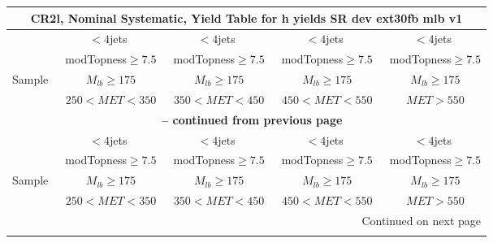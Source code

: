 \documentclass{article}
\begin{document}
\begin{longtable}{|l|c|c|c|c|} 
 
\multicolumn{5}{c}{ CR2l, Nominal Systematic, Yield Table for h yields SR dev ext30fb mlb v1 }\\* \hline 
  & $<4$jets  & $<4$jets  & $<4$jets  & $<4$jets \\* 
  & ~modTopness$\ge7.5$  & ~modTopness$\ge7.5$  & ~modTopness$\ge7.5$  & ~modTopness$\ge7.5$ \\* 
Sample  & ~$M_{lb}\ge175$  & ~$M_{lb}\ge175$  & ~$M_{lb}\ge175$  & ~$M_{lb}\ge175$ \\* 
  & ~$250<MET<350$  & ~$350<MET<450$  & ~$450<MET<550$  & ~$MET>550$ \\* 
\hline \hline 
\endfirsthead 
 
\multicolumn{5}{c}{{\bfseries \tablename\ \thetable{} -- continued from previous page}}\\* \hline 
  & $<4$jets  & $<4$jets  & $<4$jets  & $<4$jets \\* 
  & ~modTopness$\ge7.5$  & ~modTopness$\ge7.5$  & ~modTopness$\ge7.5$  & ~modTopness$\ge7.5$ \\* 
Sample  & ~$M_{lb}\ge175$  & ~$M_{lb}\ge175$  & ~$M_{lb}\ge175$  & ~$M_{lb}\ge175$ \\* 
  & ~$250<MET<350$  & ~$350<MET<450$  & ~$450<MET<550$  & ~$MET>550$ \\* 
\hline \hline 
\endhead 
 
\multicolumn{5}{|r|}{{Continued on next page}}\\* \hline 
\endfoot 
 
 
\endlastfoot 
 

\end{longtable}
\end{document}
